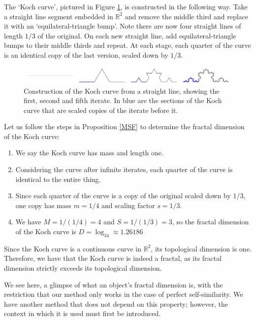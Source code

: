 \begin{exmp} \label{exmp2.3}
    The `Koch curve', pictured in Figure \ref{fig:Koch}, is constructed in the following way. Take a straight line segment embedded in $\mathbb{R}^2$ and remove the middle third and replace it with an `equilateral-triangle bump'. Note there are now four straight lines of length $1/3$ of the original. On each new straight line, add equilateral-triangle bumps to their middle thirds and repeat. At each stage, each quarter of the curve is an identical copy of the last version, scaled down by $1/3$.
    \begin{figure}
        \centering
        \includegraphics[width=1\linewidth]{Images/Koch new.png}
        \caption{Construction of the Koch curve from a straight line, showing the first, second and fifth iterate. In blue are the sections of the Koch curve that are scaled copies of the iterate before it.}
        \label{fig:Koch}
    \end{figure}
    Let us follow the steps in Proposition \ref{MSF} to determine the fractal dimension of the Koch curve:
    \begin{enumerate}
        \item We say the Koch curve has mass and length one.
        \item Considering the curve after infinite iterates, each quarter of the curve is identical to the entire thing.
        \item Since each quarter of the curve is a copy of the original scaled down by $1/3$, one copy has mass $m=1/4$ and scaling factor $s=1/3$.
        \item We have $M=1/(1/4)=4$ and $S=1/(1/3)=3$, so the fractal dimension of the Koch curve is $D=\log_34\approx1.26186$
    \end{enumerate}
    Since the Koch curve is a continuous curve in $\mathbb{R}^2$, its topological dimension is one. Therefore, we have that the Koch curve is indeed a fractal, as its fractal dimension strictly exceeds its topological dimension.
\end{exmp}
We see here, a glimpse of what an object's fractal dimension is, with the restriction that our method only works in the case of perfect self-similarity. We have another method that does not depend on this property; however, the context in which it is used must first be introduced.
